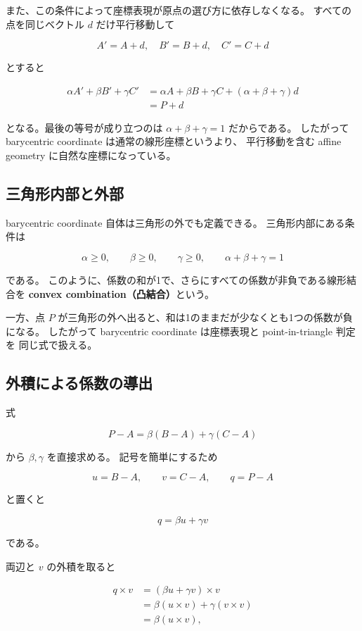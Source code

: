 \documentclass[a4paper,11pt]{ltjsarticle}
\begin{document}
また、この条件によって座標表現が原点の選び方に依存しなくなる。
すべての点を同じベクトル $d$ だけ平行移動して

\[
  A'=A+d,\quad B'=B+d,\quad C'=C+d
\]

とすると

\begin{align*}
  \alpha A'+\beta B'+\gamma C'
  &=\alpha A+\beta B+\gamma C
    +(\alpha+\beta+\gamma)d\\
  &=P+d
\end{align*}

となる。最後の等号が成り立つのは
$\alpha+\beta+\gamma=1$ だからである。
したがって barycentric coordinate は通常の線形座標というより、
平行移動を含む affine geometry に自然な座標になっている。

\subsection{三角形内部と外部}

barycentric coordinate 自体は三角形の外でも定義できる。
三角形内部にある条件は

\begin{equation}
  \boxed{
    \alpha\ge0,\qquad
    \beta\ge0,\qquad
    \gamma\ge0,
    \qquad
    \alpha+\beta+\gamma=1
  }
\end{equation}

である。
このように、係数の和が1で、さらにすべての係数が非負である線形結合を
\textbf{convex combination（凸結合）}という。

一方、点 $P$ が三角形の外へ出ると、和は1のままだが少なくとも1つの係数が負になる。
したがって barycentric coordinate は座標表現と point-in-triangle 判定を
同じ式で扱える。

\subsection{外積による係数の導出}

式

\[
  P-A=\beta(B-A)+\gamma(C-A)
\]

から $\beta,\gamma$ を直接求める。
記号を簡単にするため

\[
  u=B-A,\qquad
  v=C-A,\qquad
  q=P-A
\]

と置くと

\[
  q=\beta u+\gamma v
\]

である。

両辺と $v$ の外積を取ると

\begin{align*}
  q\times v
  &=(\beta u+\gamma v)\times v\\
  &=\beta(u\times v)+\gamma(v\times v)\\
  &=\beta(u\times v),
\end{align*}
\end{document}
